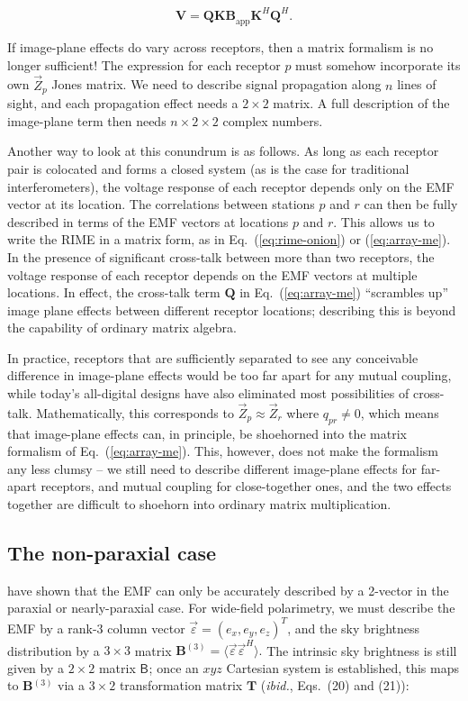 \documentclass[]{aa}
\newcommand{\herm}{H}
\newcommand{\jones}[2]{\vec {#1}_{#2}}
\newcommand{\coh}[2]{\mathsf{{#1}}_{{#2}}}
\begin{document}
\[
\mathbf{V}=\mathbf{QKB}_\mathrm{app} \mathbf{K}^\herm \mathbf{Q}^\herm.
\]

If image-plane effects do vary across receptors, then a matrix formalism
is no longer sufficient! The expression for each receptor
$p$ must somehow incorporate its own $\jones{Z}{p}$ Jones matrix.
We need to describe signal propagation along $n$ lines of sight,
and each propagation effect needs a $2\times2$ matrix. A full description of 
the image-plane term then needs $n\times2\times2$ complex numbers. 

Another way to look at this conundrum is as follows. As long as each
receptor pair is colocated and forms a closed system (as is the case
for traditional interferometers), the voltage response of each receptor
depends only on the EMF vector at its location. The correlations between
stations $p$ and $r$ can then be fully described in terms of the
EMF vectors at locations $p$ and $r$. This allows us to write the RIME
in a matrix form, as in Eq.~(\ref{eq:rime-onion}) or (\ref{eq:array-me}). In the presence of significant
cross-talk between more than two receptors, the voltage response of
each receptor depends on the EMF vectors at multiple locations. In effect,
the cross-talk term $\mathbf{Q}$ in Eq.~(\ref{eq:array-me}) ``scrambles up'' image plane effects between
different receptor locations; describing this is beyond the capability of ordinary matrix algebra.

In practice, receptors that are sufficiently separated to see any conceivable difference in image-plane effects would be too 
far apart for any mutual coupling, while today's all-digital designs have also eliminated most possibilities of 
cross-talk. Mathematically, this corresponds to $\jones{Z}{p} \approx \jones{Z}{r}$ where $q_{pr} \ne 0$, which means that image-plane 
effects can, in principle, be shoehorned into the matrix formalism of Eq.~(\ref{eq:array-me}). This, however, 
does not make the formalism any less clumsy -- we still need to describe different image-plane effects for far-apart receptors, and mutual coupling for close-together ones, and the two effects together are difficult to shoehorn into ordinary matrix multiplication. 

\subsection{The non-paraxial case}
\label{sec:matrix-3d}

\citet{Carozzi:ME3D} have shown that the EMF can only be accurately described by a 2-vector in the paraxial or nearly-paraxial case. For wide-field polarimetry, we must describe the EMF by a rank-3 column vector $\vec\varepsilon=(e_x,e_y,e_z)^T$, and the sky brightness distribution by a $3\times3$ matrix $\mathbf{B}^{(3)}=\langle \vec\varepsilon \vec\varepsilon^\herm \rangle.$ The intrinsic sky brightness is still given by a $2\times2$ matrix $\coh{B}{}$; once an $xyz$ Cartesian system is established, this maps to $\mathbf{B}{}^{(3)}$ via a $3\times2$ transformation matrix $\mathbf{T}$ ({\em ibid.}, Eqs.~(20) and (21)):
\end{document}
